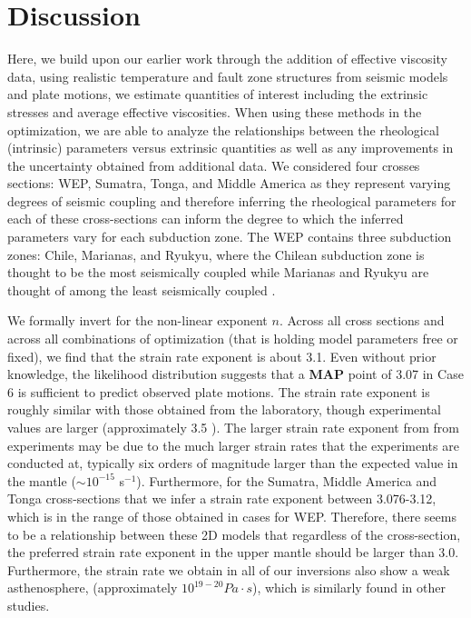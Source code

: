 \documentclass[12pt]{article}
\begin{document}
{\section{Discussion}

Here, we build upon our earlier work \citep{ratnaswamy2015adjoint} through the addition of effective viscosity data, using realistic temperature and fault zone structures from seismic models and plate motions, we estimate quantities of interest including the extrinsic stresses and average effective viscosities. 
When using these methods in the optimization, we are able to analyze the relationships between the rheological (intrinsic) parameters versus extrinsic quantities as well as any improvements in the uncertainty obtained from additional data.
 We considered four crosses sections: WEP, Sumatra, Tonga, and Middle America as they represent varying degrees of seismic coupling and therefore inferring the rheological parameters for each of these cross-sections can inform the degree to which the inferred parameters vary for each subduction zone. The WEP contains three subduction zones: Chile, Marianas, and Ryukyu, where the Chilean subduction zone is thought to be the most seismically coupled while Marianas and Ryukyu are thought of among the least seismically coupled \citep{scholz2012seismic}. 

We formally invert for the non-linear exponent $n$.
Across all cross sections and across all combinations of optimization (that is holding model parameters free or fixed), we find that the strain rate exponent is about 3.1. Even without prior knowledge, the likelihood distribution suggests that a \textbf{MAP} point of 3.07 in Case 6 is sufficient to predict observed plate motions. 
  The strain rate exponent is roughly similar with those obtained from the laboratory, though experimental values are larger (approximately 3.5 \citep{karato1993rheology,ranalli1995rheology}). 
The larger strain rate exponent from from experiments may be due to 
the much larger strain
rates that the experiments are conducted at, typically six orders of magnitude larger than 
the expected value in the mantle ($\sim 10^{-15}$ s$^{-1}$).
Furthermore, 
for the Sumatra, Middle America and Tonga cross-sections that we infer a strain rate exponent between 3.076-3.12, which is in the range of those obtained in cases for WEP. Therefore, there seems to be a relationship between these 2D models that regardless of the cross-section, the preferred strain rate exponent in the upper mantle should be larger than 3.0. Furthermore, the strain rate we obtain in all of our inversions also show a weak asthenosphere, (approximately $10^{19-20}Pa\cdot s$), which is similarly found in other studies.
  
}
\end{document}
